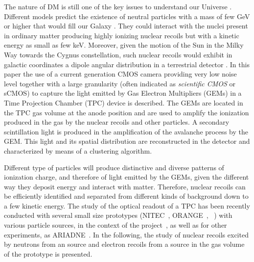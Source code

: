 \documentclass[12pt]{iopart}
\begin{document}
The nature of DM is still one of the key issues to understand our
Universe \cite{PhysRevLett.39.165,Undagoitia_2015}.  Different models
predict the existence of neutral particles with a mass of few GeV or
higher that would fill our Galaxy
\cite{PhysRevLett.113.171301,PhysRevD.79.115016,doi:10.1142/S0217751X13300287,ZUREK201491}. They
could interact with the nuclei present in ordinary matter producing
highly ionizing nuclear recoils but with a kinetic energy as small as
few keV. Moreover, given the motion of the Sun in the Milky Way
towards the Cygnus constellation, such nuclear recoils would exhibit
in galactic coordinates a dipole angular distribution in a terrestrial
detector \cite{MAYET20161}.  In this paper the use of a current
generation CMOS camera providing very low noise level together with a
large granularity (often indicated as {\it scientific CMOS} or sCMOS)
to capture the light emitted by Gas Electron Multipliers (GEMs) in a
Time Projection Chamber (TPC) device is described. The GEMs are
located in the TPC gas volume at the anode position and are used to
amplify the ionization produced in the gas by the nuclear recoils and
other particles. A secondary scintillation light is produced in the
amplification of the avalanche process by the GEM.  This light and its
spatial distribution are reconstructed in the detector and
characterized by means of a clustering algorithm.


Different type of particles will produce distinctive and diverse
patterns of ionization charge, and therefore of light emitted by the
GEMs, given the different way they deposit energy and interact with
matter.  Therefore, nuclear recoils can be efficiently identified and
separated from different kinds of background down to a few \keV
kinetic energy.  The study of the optical readout of a TPC has been
recently conducted with several small size prototypes
(NITEC~\cite{JINST:nitec},
ORANGE~\cite{NIM:Marafinietal,bib:jinst_orange2},
\lemon~\cite{bib:eps, bib:ieee17,bib:elba}) with various particle
sources, in the context of the \cygno
project~\cite{Abritta_Costa_2020,CYGNOweb}, as well as for other
experiments, as ARIADNE~\cite{Roberts_2019}. In the following, the
study of nuclear recoils excited by neutrons from an \ambe source and
electron recoils from a \fe source in the gas volume of the \lemon
prototype is presented.
\end{document}
